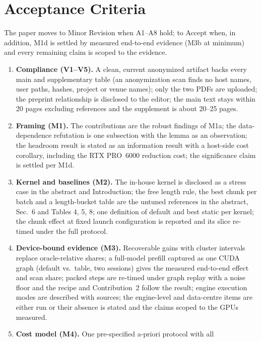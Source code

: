 \documentclass[11pt]{article}
\begin{document}
\section*{Acceptance Criteria}
The paper moves to Minor Revision when A1--A8 hold; to Accept when, in
addition, M1d is settled by measured end-to-end evidence (M3b at minimum) and
every remaining claim is scoped to the evidence.
\begin{enumerate}[label=A\arabic*.]
  \item \textbf{Compliance (V1--V5).} A clean, current anonymized artifact
        backs every main and supplementary table (an anonymization scan finds
        no host names, user paths, hashes, project or venue names); only the
        two PDFs are uploaded; the preprint relationship is disclosed to the
        editor; the main text stays within 20 pages excluding references and
        the supplement is about 20--25 pages.
  \item \textbf{Framing (M1).} The contributions are the robust findings of
        M1a; the data-dependence refutation is one subsection with the lemma
        as an observation; the headroom result is stated as an information
        result with a host-side cost corollary, including the RTX PRO~6000
        reduction cost; the significance claim is settled per M1d.
  \item \textbf{Kernel and baselines (M2).} The in-house kernel is disclosed
        as a stress case in the abstract and Introduction; the free length
        rule, the best chunk per batch and a length-bucket table are the
        untuned references in the abstract, Sec.~6 and Tables 4, 5, 8; one
        definition of default and best static per kernel; the chunk effect at
        fixed launch configuration is reported and its slice re-timed under
        the full protocol.
  \item \textbf{Device-bound evidence (M3).} Recoverable gains with cluster
        intervals replace oracle-relative shares; a full-model prefill
        captured as one CUDA graph (default vs.\ table, two sessions) gives the
        measured end-to-end effect and scan share; packed steps are re-timed
        under graph replay with a noise floor and the recipe and
        Contribution~2 follow the result; engine execution modes are described
        with sources; the engine-level and data-centre items are either run or
        their absence is stated and the claims scoped to the GPUs measured.
  \item \textbf{Cost model (M4).} One pre-specified a-priori protocol with all

\end{enumerate}
\end{document}
